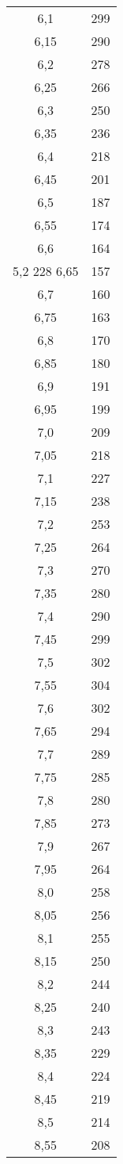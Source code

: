 \begin{longtable}{cc}
6,1  & 299\\
6,15 & 290\\
6,2  & 278\\
6,25 & 266\\
6,3  & 250\\
6,35 & 236\\
6,4  & 218\\
6,45 & 201\\
6,5  & 187\\
6,55 & 174\\
6,6  & 164\\
5,2 228
6,65 & 157\\
6,7  & 160\\
6,75 & 163\\
6,8  & 170\\
6,85 & 180\\
6,9  & 191\\
6,95 & 199\\
7,0  & 209\\
7,05 & 218\\
7,1  & 227\\
7,15 & 238\\
7,2  & 253\\
7,25 & 264\\
7,3  & 270\\
7,35 & 280\\
7,4  & 290\\
7,45 & 299\\
7,5  & 302\\
7,55 & 304\\
7,6  & 302\\
7,65 & 294\\
7,7  & 289\\
7,75 & 285\\
7,8  & 280\\
7,85 & 273\\
7,9  & 267\\
7,95 & 264\\
8,0  & 258\\
8,05 &256\\
8,1  &255\\
8,15 &250\\
8,2  &244\\
8,25 &240\\
8,3  &243\\
8,35 &229\\
8,4  &224\\
8,45 &219\\
8,5  &214\\
8,55 &208\\

\end{longtable}
